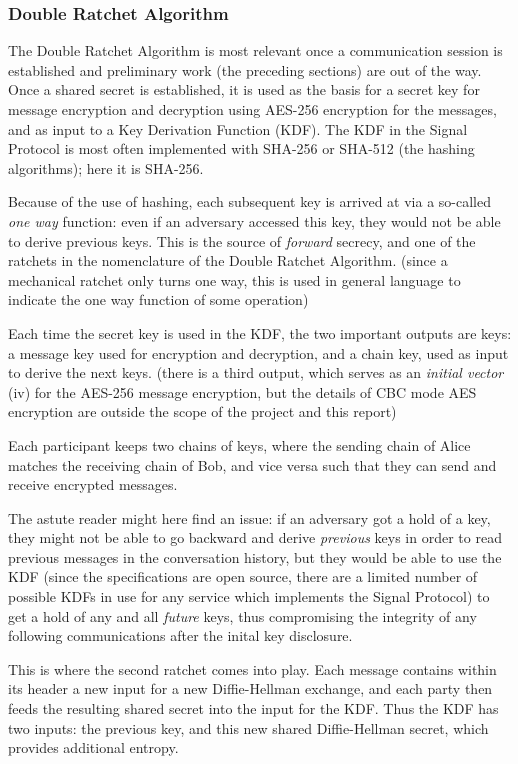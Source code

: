 \documentclass[12pt]{article}
\begin{document}
\subsubsection{Double Ratchet Algorithm}
The Double Ratchet Algorithm is most relevant once a communication session is established and preliminary work (the preceding sections) are out of the way. \parencite{website:sigdocdoubleratchet} Once a shared secret is established, it is used as the basis for a secret key for message encryption and decryption using AES-256 encryption for the messages, and as input to a Key Derivation Function (KDF). The KDF in the Signal Protocol is most often implemented with SHA-256 or SHA-512 (the hashing algorithms); here it is SHA-256. \par Because of the use of hashing, each subsequent key is arrived at via a so-called \textit{one way} function: even if an adversary accessed this key, they would not be able to derive previous keys. This is the source of \textit{forward} secrecy, and one of the ratchets in the nomenclature of the Double Ratchet Algorithm. (since a mechanical ratchet only turns one way, this is used in general language to indicate the one way function of some operation)
\par Each time the secret key is used in the KDF, the two important outputs are keys: a message key used for encryption and decryption, and a chain key, used as input to derive the next keys. (there is a third output, which serves as an \textit{initial vector} (iv) for the AES-256 message encryption, but the details of CBC mode AES encryption are outside the scope of the project and this report)
\par Each participant keeps two chains of keys, where the sending chain of Alice matches the receiving chain of Bob, and vice versa such that they can send and receive encrypted messages.
\par The astute reader might here find an issue: if an adversary got a hold of a key, they might not be able to go backward and derive \textit{previous} keys in order to read previous messages in the conversation history, but they would be able to use the KDF (since the specifications are open source, there are a limited number of possible KDFs in use for any service which implements the Signal Protocol) to get a hold of any and all \textit{future} keys, thus compromising the integrity of any following communications after the inital key disclosure.
\par This is where the second ratchet comes into play. Each message contains within its header a new input for a new Diffie-Hellman exchange, and each party then feeds the resulting shared secret into the input for the KDF. Thus the KDF has two inputs: the previous key, and this new shared Diffie-Hellman secret, which provides additional entropy.
\end{document}
